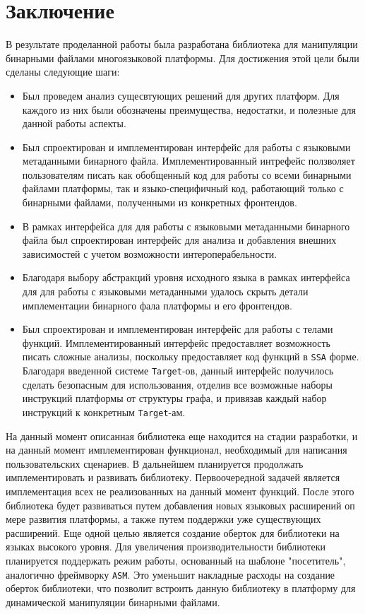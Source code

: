 \section{Заключение}
\label{sec:Chapter5} 

В результате проделанной работы была разработана библиотека для манипуляции бинарными файлами многоязыковой платформы. Для достижения этой цели были сделаны следующие шаги:

\begin{itemize}
    \item Был проведем анализ сущесвтующих решений для других платформ. Для каждого из них были обозначены преимущества, недостатки, и полезные для данной работы аспекты.
    \item Был спроектирован и имплементирован интерфейс для работы с языковыми метаданными бинарного файла. Имплементированный интрефейс ползволяет пользователям писать как обобщенный код для работы со всеми бинарными файлами платформы, так и языко-специфичный код, работающий только с бинарными файлами, полученными из конкретных фронтендов.
    \item В рамках интерфейса для для работы с языковыми метаданными бинарного файла был спроектирован интерфейс для анализа и добавления внешних зависимостей с учетом возможности интероперабельности.
    \item Благодаря выбору абстракций уровня исходного языка в рамках интерфейса для для работы с языковыми метаданными удалось скрыть детали имплементации бинарного фала платформы и его фронтендов.
    \item Был спроектирован и имплементирован интерфейс для работы с телами функций. Имплементированный интерфейс предоставляет возможность писать сложные анализы, поскольку предоставляет код функций в \texttt{SSA} форме. Благодаря введенной системе \texttt{Target}-ов, данный интерфейс получилось сделать безопасным для использования, отделив все возможные наборы инструкций платформы от структуры графа, и привязав каждый набор инструкций к конкретным \texttt{Target}-ам.
\end{itemize}

На данный момент описанная библиотека еще находится на стадии разработки, и на данный момент имплементирован функционал, необходимый для написания пользовательских сценариев. В дальнейшем планируется продолжать имплементировать и развивать библиотеку. Первоочередной задачей является имплементация всех не реализованных на данный момент функций. После этого библиотека будет развиваться путем добавления новых языковых расширений оп мере развития платформы, а также путем поддержки уже существующих расширений. Еще одной целью является создание оберток для библиотеки на языках высокого уровня. Для увеличения производительности библиотеки планируется поддержать режим работы, основанный на шаблоне "посетитель", аналогично фреймворку \texttt{ASM}. Это уменьшит накладные расходы на создание оберток библиотеки, что позволит встроить данную библиотеку в платформу для динамической манипуляции бинарными файлами.

\newpage
